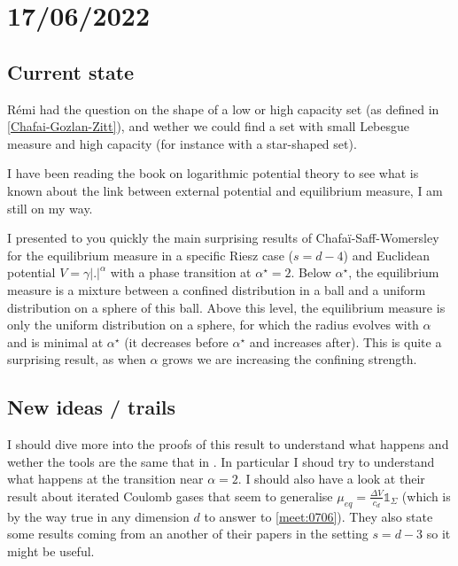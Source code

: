 \documentclass[a4paper,12pt]{report}
\begin{document}
\section{17/06/2022}

\subsection*{Current state}

Rémi had the question on the shape of a low or high capacity set (as defined in \ref{Chafai-Gozlan-Zitt}), and wether we could find a set with small Lebesgue measure and high capacity (for instance with a star-shaped set).
\vspace{0.5cm}

I have been reading the book on logarithmic potential theory \cite{saff-totik} to see what is known about the link between external potential and equilibrium measure, I am still on my way.
\vspace{0.5cm}

I presented to you quickly the main surprising results of Chafa\"i-Saff-Womersley \cite{chafai-saff-womersley} for the equilibrium measure in a specific Riesz case ($s = d - 4$) and Euclidean potential $V = \gamma \lvert . \rvert^{\alpha}$ with a phase transition at $\alpha^{\star} = 2$. Below $\alpha^{\star}$, the equilibrium measure is a mixture between a confined distribution in a ball and a uniform distribution on a sphere of this ball. Above this level, the equilibrium measure is only the uniform distribution on a sphere, for which the radius evolves with $\alpha$ and is minimal at $\alpha^{\star}$ (it decreases before $\alpha^{\star}$ and increases after). This is quite a surprising result, as when $\alpha$ grows we are increasing the confining strength. 

\subsection*{New ideas / trails}

I should dive more into the proofs of this result to understand what happens and wether the tools are the same that in \cite{chafai-gozlan-zitt}. In particular I shoud try to understand what happens at the transition near $\alpha = 2$. I should also have a look at their result about iterated Coulomb gases that seem to generalise $\mu_{eq} = \frac{\Delta V}{c_d} \mathds{1}_{\Sigma}$ (which is by the way true in any dimension $d$ to answer to \ref{meet:0706}). They also state some results coming from an another of their papers in the setting $s = d-3$ so it might be useful.
\vspace{0.5cm}
\end{document}
